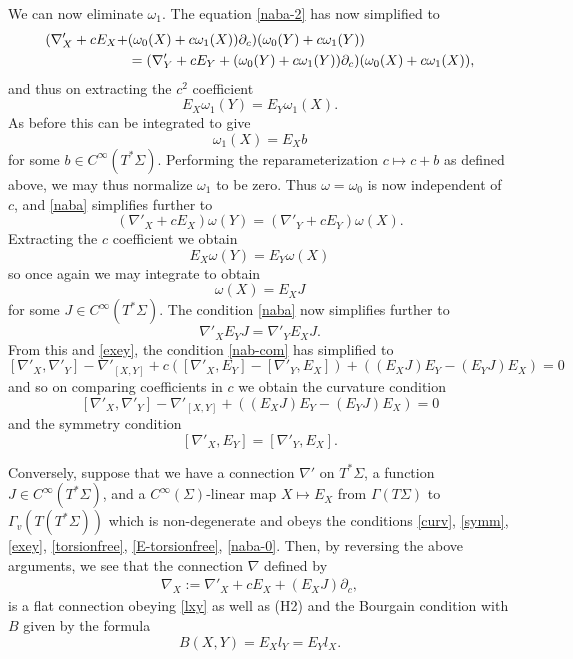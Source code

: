 \documentclass{article}
\numberwithin{equation}{section}
\theoremstyle{plain}
\begin{document}
We can now eliminate $\omega_1$.  The equation \eqref{naba-2} has now simplified to
\begin{align}\label{naba}
    (\nabla'_X + c E_X + 
    & (\omega_0(X) + c \omega_1(X)) \partial_c) (\omega_0(Y) + c \omega_1(Y))  \\ 
    &=(\nabla'_Y + c E_Y + (\omega_0(Y) + c \omega_1(Y)) \partial_c) (\omega_0(X) + c \omega_1(X)),\notag
\end{align}
and thus on extracting the $c^2$ coefficient
$$ E_X \omega_1(Y) = E_Y \omega_1(X).$$
As before this can be integrated to give
$$ \omega_1(X) = E_X b$$
for some $b \in C^\infty(T^* \Sigma)$.  Performing the reparameterization $c \mapsto c+b$ as defined above, we may thus normalize $\omega_1$ to be zero.  Thus $\omega = \omega_0$ is now independent of $c$, and \eqref{naba} simplifies further to
$$ (\nabla'_X + c E_X) \omega(Y) =
(\nabla'_Y + c E_Y) \omega(X).$$
Extracting the $c$ coefficient we obtain
$$ E_X \omega(Y) = E_Y \omega(X)$$
so once again we may integrate to obtain
$$ \omega(X) = E_X J$$
for some $J \in C^\infty(T^*\Sigma)$.  The condition \eqref{naba} now simplifies further to
\begin{equation}\label{naba-0}
\nabla'_X E_Y J = \nabla'_Y E_X J.
\end{equation}
From this and \eqref{exey}, the condition \eqref{nab-com} has simplified to
$$ [\nabla'_X,\nabla'_Y] - \nabla'_{[X,Y]} + c ([\nabla'_X,E_Y] - [\nabla'_Y, E_X]) + ((E_X J) E_Y - (E_Y J) E_X) = 0$$
and so on comparing coefficients in $c$ we obtain the curvature condition
\begin{equation}\label{curv}
    [\nabla'_X,\nabla'_Y] - \nabla'_{[X,Y]} + ((E_X J) E_Y - (E_Y J) E_X) = 0
\end{equation}
and the symmetry condition
\begin{equation}\label{symm}
    [\nabla'_X,E_Y] = [\nabla'_Y, E_X].
\end{equation}

\smallskip

Conversely, suppose that we have a connection $\nabla'$ on $T^* \Sigma$, a function $J \in C^\infty(T^* \Sigma)$, and a $C^\infty(\Sigma)$-linear map $X \mapsto E_X$ from $\Gamma(T\Sigma)$ to $\Gamma_v(T(T^*\Sigma))$ which is non-degenerate and obeys the conditions \eqref{curv}, \eqref{symm}, \eqref{exey}, \eqref{torsionfree}, \eqref{E-torsionfree}, \eqref{naba-0}.  Then, by reversing the above arguments, we see that the connection $\nabla$ defined by
\begin{align}\label{260604leD-19}
    \nabla_X := \nabla'_X + c E_X + (E_X J) \partial_c,
\end{align} 
is a flat connection obeying \eqref{lxy} as well as (H2) and the Bourgain condition with $B$ given by the formula
$$ B(X,Y) = E_X l_Y = E_Y l_X.$$
\end{document}
